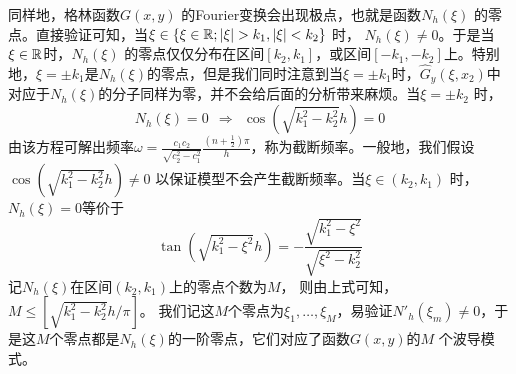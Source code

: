\begin{remark}
同样地，格林函数$G(x,y)$ 的Fourier变换会出现极点，也就是函数$N_h(\xi)$ 的零点。直接验证可知，当$\xi\in\{\xi\in\R;|\xi|>k_1,|\xi|<k_2\}$ 时，
$N_h(\xi)\neq0$。于是当$\xi\in\mathbb{R}$时，$N_h(\xi)$ 的零点仅仅分布在区间$[k_2,k_1]$，或区间$[-k_1,-k_2]$上。特别地，$\xi=\pm k_1$是$N_h(\xi)$的零点，但是我们同时注意到当$\xi=\pm k_1$时，$\hat G_y(\xi,x_2)$中对应于$N_h(\xi)$的分子同样为零，并不会给后面的分析带来麻烦。当$\xi=\pm k_2$ 时，
\begin{equation}
  N_h(\xi)=0\ \ \Rightarrow\ \ \cos\left(\sqrt{k_1^2-k_2^2}h\right)=0
\end{equation}
由该方程可解出频率$\omega=\frac{c_1c_2}{\sqrt{c_2^2-c_1^2}}\frac{(n+\frac{1}{2})\pi}{h}$，称为截断频率。一般地，我们假设$\cos\left(\sqrt{k_1^2-k_2^2}h\right)\neq0$ 以保证模型不会产生截断频率。当$\xi\in(k_2,k_1)$ 时，$N_h(\xi)=0$等价于
\begin{equation}
  \tan{\left(\sqrt{k_1^2-\xi^2}h\right)}=-\frac{\sqrt{k_1^2-\xi^2}}{\sqrt{\xi^2-k_2^2}}
\end{equation}
记$N_h(\xi)$在区间$(k_2,k_1)$上的零点个数为$M$， 则由上式可知，$M\leq\left[\sqrt{k_1^2-k_2^2}h/\pi\right]$。 我们记这$M$个零点为$\xi_1,\ldots,\xi_M$，易验证$N'_h(\xi_m)\neq0$，于是这$M$个零点都是$N_h(\xi)$的一阶零点，它们对应了函数$G(x,y)$的$M$ 个波导模式。

\end{remark}
